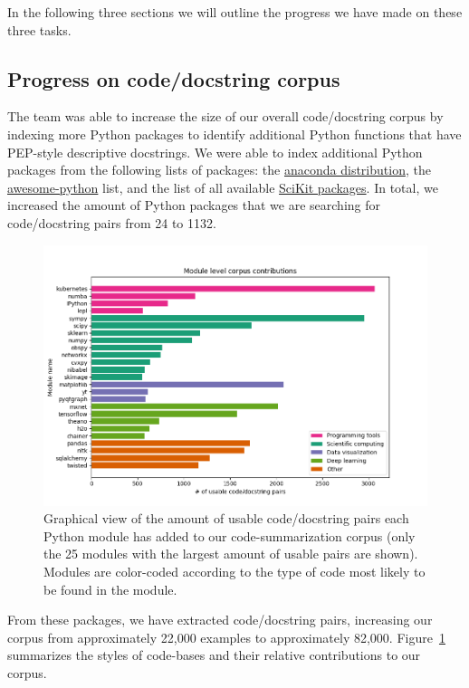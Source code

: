 \documentclass[article, 12pt, oneside]{memoir}
\begin{document}
In the following three sections we will outline the progress we have
made on these three tasks.

\hypertarget{progress-on-codedocstring-corpus}{%
\subsection{Progress on code/docstring
corpus}\label{progress-on-codedocstring-corpus}}

The team was able to increase the size of our overall code/docstring
corpus by indexing more Python packages to identify additional Python
functions that have PEP-style descriptive docstrings. We were able to
index additional Python packages from the following lists of packages:
the
\href{https://docs.anaconda.com/anaconda/packages/py3.6_osx-64/}{anaconda
distribution}, the
\href{https://github.com/vinta/awesome-python}{awesome-python} list, and
the list of all available
\href{http://scikits.appspot.com/scikits}{SciKit packages}. In total, we
increased the amount of Python packages that we are searching for
code/docstring pairs from 24 to 1132.

\begin{figure}[h]
\centering
\includegraphics{figs/module_corpus_contributions.png}
\caption{Graphical view of the amount of usable code/docstring pairs
each Python module has added to our code-summarization corpus (only the
25 modules with the largest amount of usable pairs are shown). Modules
are color-coded according to the type of code most likely to be found in
the module.\label{fig:sum_corpus}}
\end{figure}

From these packages, we have extracted code/docstring pairs, increasing
our corpus from approximately 22,000 examples to approximately 82,000.
Figure~\ref{fig:sum_corpus} summarizes the styles of code-bases and their
relative contributions to our corpus.
\end{document}
